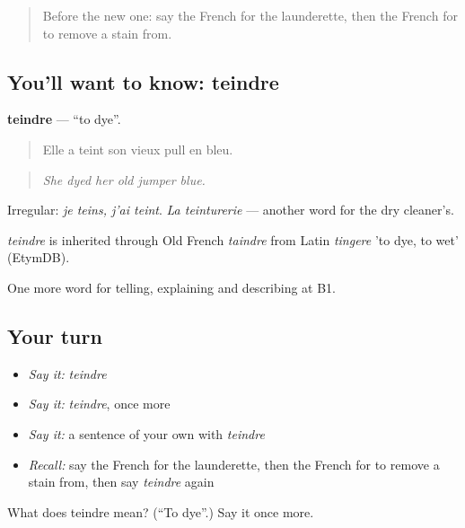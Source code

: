 \begin{quote}
Before the new one: say the French for the launderette, then the French for to remove a stain from.
\end{quote}

\subsection*{You'll want to know: teindre}
\textbf{teindre} — \textquotedblleft{}to dye\textquotedblright{}.

\begin{quote}
Elle a teint son vieux pull en bleu.
\end{quote}

\begin{quote}
\emph{She dyed her old jumper blue.}
\end{quote}

Irregular: \emph{je teins, j'ai teint}. \emph{La teinturerie} — another word for the dry cleaner's.

\begin{cousinweb}
\emph{teindre} is inherited through Old French \emph{taindre} from Latin \emph{tingere} 'to dye, to wet' (EtymDB).
\end{cousinweb}

\begin{grammarlens}[title={What you've built}]
One more word for telling, explaining and describing at B1.
\end{grammarlens}

\subsection*{Your turn}
\begin{itemize}
\raggedright
  \item \emph{Say it:} \emph{teindre}
  \item \emph{Say it:} \emph{teindre}, once more
  \item \emph{Say it:} a sentence of your own with \emph{teindre}
  \item \emph{Recall:} say the French for the launderette, then the French for to remove a stain from, then say \emph{teindre} again
\end{itemize}

\begin{tcolorbox}[breakable,colback=teal!4,colframe=teal!35!black,title={Before you move on}]
What does teindre mean? (\textquotedblleft{}To dye\textquotedblright{}.) Say it once more.
\end{tcolorbox}
